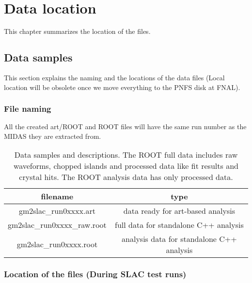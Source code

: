 \chapter{Data location}
\label{app:data}

This chapter summarizes the location of the files.

\section{Data samples}

This section explains the naming and the locations of the data files (Local location will be obsolete once we move everything
to the PNFS disk at FNAL).

\subsection{File naming}

All the created art/ROOT and ROOT files will have the same run number as the MIDAS they are extracted from.

\begin{table}[htbp]
\centering
\caption{Data samples and descriptions. The ROOT full data includes raw waveforms, chopped islands and processed data like fit results and crystal hits. The ROOT analysis data has only processed data.}
\begin{tabular}{|c|c|} \hline 
filename & type \\ \hline 
gm2slac\_run0xxxx.art & data ready for art-based analysis \\ \hline 
gm2slac\_run0xxxx\_raw.root & full data for standalone C++ analysis \\ \hline 
gm2slac\_run0xxxx.root & analysis data for standalone C++ analysis \\ \hline 
\end{tabular} \label{tab:datasamples}
\end{table}

\subsection{Location of the files (During SLAC test runs)}

